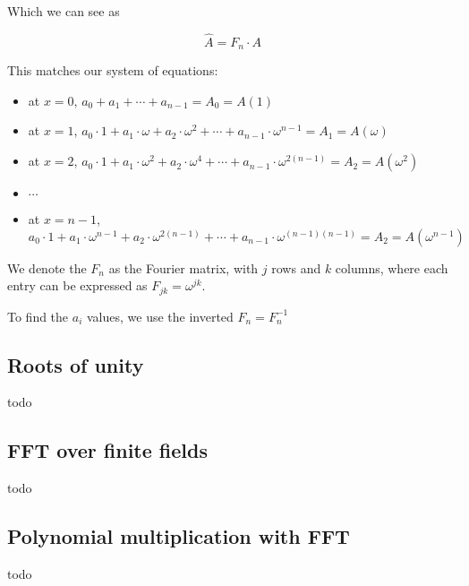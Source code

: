 \documentclass{article}
\theoremstyle{definition}
\begin{document}
Which we can see as

$$
\hat{A} = F_n \cdot A
$$

This matches our system of equations:

\begin{itemize}
  \item at $x=0$, $a_0 + a_1 + \cdots + a_{n-1} = A_0 = A(1)$
  \item at $x=1$, $a_0 \cdot 1 + a_1 \cdot \omega + a_2 \cdot \omega^2 + \cdots + a_{n-1} \cdot \omega^{n-1} = A_1 = A(\omega)$
  \item at $x=2$, $a_0 \cdot 1 + a_1 \cdot \omega^2 + a_2 \cdot \omega^4 + \cdots + a_{n-1} \cdot \omega^{2(n-1)} = A_2 = A(\omega^2)$
  \item $\cdots$
  \item at $x=n-1$, $a_0 \cdot 1 + a_1 \cdot \omega^{n-1} + a_2 \cdot \omega^{2(n-1)} + \cdots + a_{n-1} \cdot \omega^{(n-1)(n-1)} = A_2 = A(\omega^{n-1})$
\end{itemize}

We denote the $F_n$ as the Fourier matrix, with $j$ rows and $k$ columns, where each entry can be expressed as $F_{jk} = \omega^{jk}$.

To find the $a_i$ values, we use the inverted $F_n = F_n^{-1}$

\subsection{Roots of unity}
todo

\subsection{FFT over finite fields}
todo

\subsection{Polynomial multiplication with FFT}
todo




\end{document}
